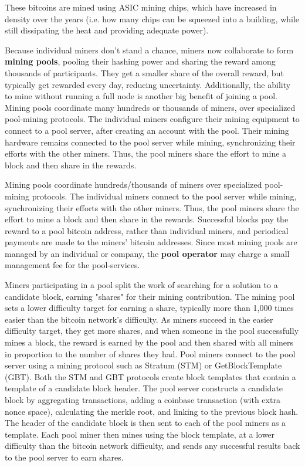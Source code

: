 \documentclass{article}
\begin{document}
    These bitcoins are mined using ASIC mining chips, which have increased in density over the years (i.e. how many chips can be squeezed into a building, while still dissipating the heat and providing adequate power).

    Because individual miners don't stand a chance, miners now collaborate to form \textbf{mining pools}, pooling their hashing power and sharing the reward among thousands of participants. They get a smaller share of the overall reward, but typically get rewarded every day, reducing uncertainty. Additionally, the ability to mine without running a full node is another big benefit of joining a pool. Mining pools coordinate many hundreds or thousands of miners, over specialized pool-mining protocols. The individual miners configure their mining equipment to connect to a pool server, after creating an account with the pool. Their mining hardware remains connected to the pool server while mining, synchronizing their efforts with the other miners. Thus, the pool miners share the effort to mine a block and then share in the rewards.

    Mining pools coordinate hundreds/thousands of miners over specialized pool-mining protocols. The individual miners connect to the pool server while mining, synchronizing their efforts with the other miners. Thus, the pool miners share the effort to mine a block and then share in the rewards. Successful blocks pay the reward to a pool bitcoin address, rather than individual miners, and periodical payments are made to the miners' bitcoin addresses. Since most mining pools are managed by an individual or company, the \textbf{pool operator} may charge a small management fee for the pool-services.

    Miners participating in a pool split the work of searching for a solution to a candidate block, earning "shares" for their mining contribution. The mining pool sets a lower difficulty target for earning a share, typically more than 1,000 times easier than the bitcoin network's difficulty. As miners succeed in the easier difficulty target, they get more shares, and when someone in the pool successfully mines a block, the reward is earned by the pool and then shared with all miners in proportion to the number of shares they had. Pool miners connect to the pool server using a mining protocol such as Stratum (STM) or GetBlockTemplate (GBT). Both the STM and GBT protocols create block templates that contain a template of a candidate block header. The pool server constructs a candidate block by aggregating transactions, adding a coinbase transaction (with extra nonce space), calculating the merkle root, and linking to the previous block hash. The header of the candidate block is then sent to each of the pool miners as a template. Each pool miner then mines using the block template, at a lower difficulty than the bitcoin network difficulty, and sends any successful results back to the pool server to earn shares.
\end{document}
